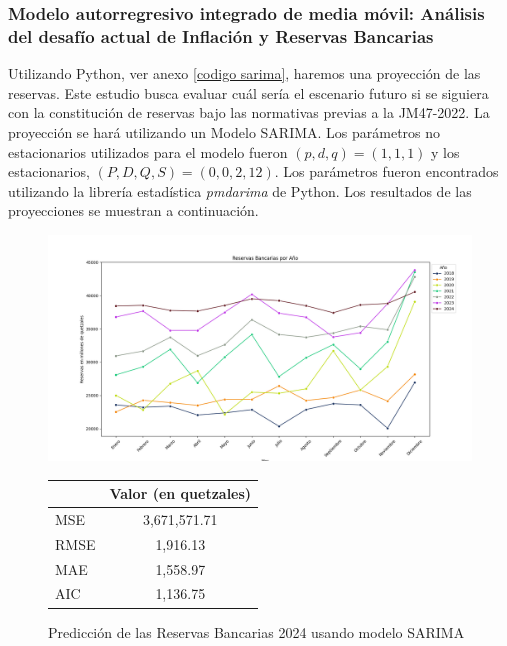 \subsubsection{Modelo autorregresivo integrado de media móvil: Análisis del desafío actual de Inflación y Reservas Bancarias}
Utilizando Python, ver anexo \ref{codigo sarima}, haremos una proyección de las reservas. Este estudio busca evaluar cuál sería el escenario futuro si se siguiera con la constitución de reservas bajo las normativas previas a la JM47-2022. La proyección se hará utilizando un Modelo SARIMA. Los parámetros no estacionarios utilizados para el modelo fueron $(p,d,q) = (1,1,1)$ y los  estacionarios, $(P,D, Q, S) = (0,0,2,12)$. Los parámetros fueron encontrados utilizando la librería estadística \textit{pmdarima} de Python. Los resultados de las proyecciones se muestran a continuación. 
\begin{figure}[H]
    \centering
    \begin{minipage}{.85\textwidth}
        \centering
        \includegraphics[width=\linewidth]{imagenes/prediccion_reservas_sarima.png}
        \caption{Predicción de las Reservas Bancarias 2024 usando modelo SARIMA}
        \label{fig:sarima-prediction}
    \end{minipage}%
    \begin{minipage}{.15\textwidth}
        \centering
        {\scriptsize 
        \begin{tabular}{lc}
            \hline
             & Valor (en quetzales) \\
            \hline
            MSE & 3,671,571.71 \\
            RMSE & 1,916.13 \\
            MAE & 1,558.97 \\
            AIC & 1,136.75 \\
            \hline
        \end{tabular}
        }
        \label{proyeccion sarima}
    \end{minipage}
\end{figure}
